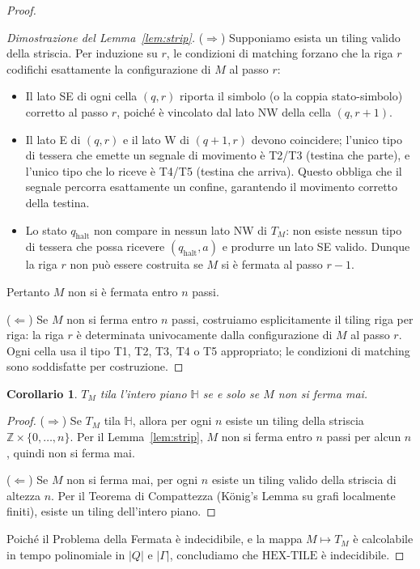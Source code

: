 \documentclass[12pt, a4paper]{article}
\newtheorem{corollario}{Corollario}
\begin{document}
\begin{proof}
\begin{proof}[Dimostrazione del Lemma~\ref{lem:strip}]
($\Rightarrow$)
Supponiamo esista un tiling valido della striscia. Per induzione su $r$, le condizioni di
matching forzano che la riga $r$ codifichi esattamente la configurazione di $M$ al passo $r$:
\begin{itemize}
  \item Il lato SE di ogni cella $(q, r)$ riporta il simbolo (o la coppia stato-simbolo)
        corretto al passo $r$, poiché è vincolato dal lato NW della cella $(q, r+1)$.
  \item Il lato E di $(q, r)$ e il lato W di $(q+1, r)$ devono coincidere; l'unico tipo
        di tessera che emette un segnale di movimento è T2/T3 (testina che parte), e l'unico
        tipo che lo riceve è T4/T5 (testina che arriva). Questo obbliga che il segnale
        percorra esattamente un confine, garantendo il movimento corretto della testina.
  \item Lo stato $q_{\mathrm{halt}}$ non compare in nessun lato NW di $T_M$: non esiste
        nessun tipo di tessera che possa ricevere $(q_{\mathrm{halt}}, a)$ e produrre un
        lato SE valido. Dunque la riga $r$ non può essere costruita se $M$ si è fermata
        al passo $r-1$.
\end{itemize}
Pertanto $M$ non si è fermata entro $n$ passi.

($\Leftarrow$)
Se $M$ non si ferma entro $n$ passi, costruiamo esplicitamente il tiling riga per riga:
la riga $r$ è determinata univocamente dalla configurazione di $M$ al passo $r$. Ogni
cella usa il tipo T1, T2, T3, T4 o T5 appropriato; le condizioni di matching sono
soddisfatte per costruzione.
\end{proof}

\begin{corollario}
$T_M$ tila l'intero piano $\mathbb{H}$ se e solo se $M$ non si ferma mai.
\end{corollario}

\begin{proof}
($\Rightarrow$) Se $T_M$ tila $\mathbb{H}$, allora per ogni $n$ esiste un tiling della
striscia $\mathbb{Z} \times \{0,\ldots,n\}$. Per il Lemma~\ref{lem:strip}, $M$ non si
ferma entro $n$ passi per alcun $n$, quindi non si ferma mai.

($\Leftarrow$) Se $M$ non si ferma mai, per ogni $n$ esiste un tiling valido della
striscia di altezza $n$. Per il Teorema di Compattezza (König's Lemma su grafi
localmente finiti), esiste un tiling dell'intero piano.
\end{proof}

Poiché il Problema della Fermata è indecidibile, e la mappa $M \mapsto T_M$ è calcolabile
in tempo polinomiale in $|Q|$ e $|\Gamma|$, concludiamo che $\mathrm{HEX\text{-}TILE}$ è
indecidibile.
\end{proof}
\end{document}
